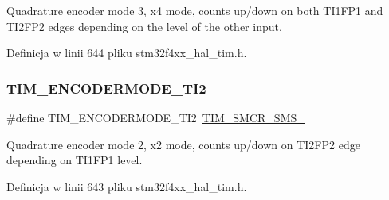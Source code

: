 Quadrature encoder mode 3, x4 mode, counts up/down on both T\+I1\+F\+P1 and T\+I2\+F\+P2 edges depending on the level of the other input. 

Definicja w linii 644 pliku stm32f4xx\+\_\+hal\+\_\+tim.\+h.

\mbox{\label{group___t_i_m___encoder___mode_ga9166e985a35358cb3ed942c2a36e018d}} 
\subsubsection{\texorpdfstring{T\+I\+M\+\_\+\+E\+N\+C\+O\+D\+E\+R\+M\+O\+D\+E\+\_\+\+T\+I2}{TIM\_ENCODERMODE\_TI2}}
{\footnotesize\ttfamily \#define T\+I\+M\+\_\+\+E\+N\+C\+O\+D\+E\+R\+M\+O\+D\+E\+\_\+\+T\+I2~\hyperlink{group___peripheral___registers___bits___definition_gaa980a3121ab6cda5a4a42b959da8421e}{T\+I\+M\+\_\+\+S\+M\+C\+R\+\_\+\+S\+M\+S\+\_}}

Quadrature encoder mode 2, x2 mode, counts up/down on T\+I2\+F\+P2 edge depending on T\+I1\+F\+P1 level. 

Definicja w linii 643 pliku stm32f4xx\+\_\+hal\+\_\+tim.\+h.

